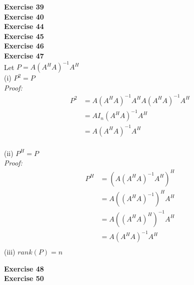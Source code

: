 \documentclass[letterpaper,12pt]{article}
\theoremstyle{definition}
\begin{document}
\textbf{Exercise 39} \\

\textbf{Exercise 40} \\

\textbf{Exercise 44} \\

\textbf{Exercise 45} \\

\textbf{Exercise 46} \\

\textbf{Exercise 47} \\
Let $P = A(A^H A)^{-1}A^H$ \\
(i) $P^2 = P$ \\
\textit{Proof:}
\begin{align*}
  P^2 &= A(A^H A)^{-1} A^H A (A^H A)^{-1} A^H \\
  &= A I_n (A^H A)^{-1} A^H \\
  &= A (A^H A)^{-1} A^H \\
\end{align*}

(ii) $P^H = P$ \\
\textit{Proof:}
\begin{align*}
  P^H &= (A(A^H A)^{-1}A^H)^H \\
  &= A ((A^H A)^{-1})^H A^H \\
  &= A ((A^H A)^H)^{-1} A^H \\
  &= A (A^H A)^{-1} A^H \\
\end{align*}
(iii) $rank(P) = n$

\textbf{Exercise 48} \\


\textbf{Exercise 50} \\
\end{document}
